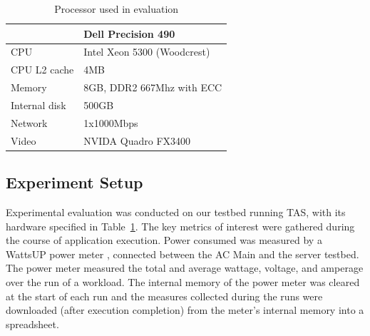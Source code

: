 \documentclass[times, 10pt,twocolumn]{IEEEtran}
\begin{document}
\begin{table}[tbhp] 
\centering
  \caption{Processor used in evaluation}
  \label{tab:hardware}
  \begin{tabular}{l l} 
\hline 
\hline
&\textbf{Dell Precision 490}\\ 
\hline 
CPU&Intel Xeon 5300 (Woodcrest)\\ 
CPU L2 cache&4MB\\ 
Memory&8GB, DDR2 667Mhz with ECC\\
Internal disk&500GB\\ 
Network&1x1000Mbps\\ 
Video&NVIDA Quadro FX3400\\ 
\hline
  \end{tabular}
\end{table}
\subsection{Experiment Setup}
\label{sec:experiment-setup} 
Experimental evaluation was conducted on our testbed running TAS, with
its hardware specified in Table~\ref{tab:hardware}.  The key metrics of
interest were gathered during the course of application execution.
Power consumed was measured by a WattsUP power meter
\cite{WattsUp2006a}, connected between the AC Main and the server
testbed.  The power meter measured the total and average wattage,
voltage, and amperage over the run of a workload.  The internal memory
of the power meter was cleared at the start of each run and the measures
collected during the runs were downloaded (after execution completion)
from the meter's internal memory into a spreadsheet.
\end{document}
